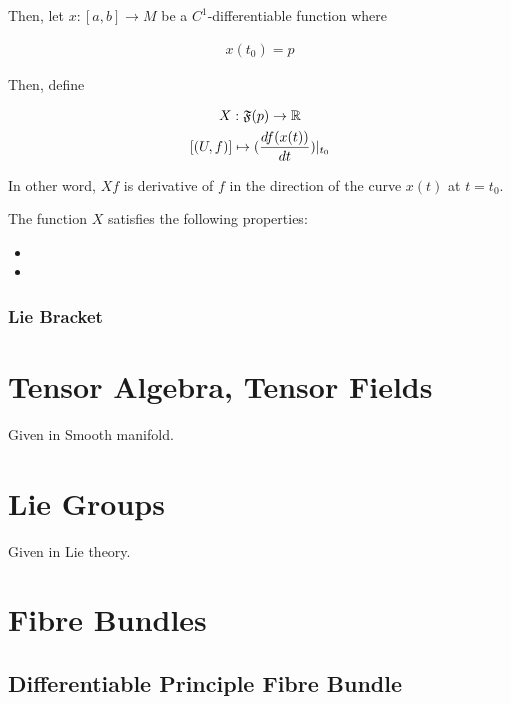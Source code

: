 \documentclass[Total.tex]{subfiles}
\begin{document}
						Then, let $x:[a,b]\rightarrow M$ be a $C^1$-differentiable function where
						
						\begin{gather*}
							x(t_0)=p
						\end{gather*}
						
						Then, define 
						
						\begin{gather*}
							X:\mathfrak{F}(p)\rightarrow \mathbb{R}\\
							[(U,f)]\mapsto (\frac{df(x(t))}{dt})|_{t_0} 
						\end{gather*}
						
						In other word, $Xf$ is derivative of $f$ in the direction of the curve $x(t)$ at $t=t_0$. 
						
						The function $X$ satisfies the following properties:
						
						\begin{itemize}
							\item 
							\item 
						\end{itemize}
						
					\subsubsection{Lie Bracket}
					
		\section{Tensor Algebra, Tensor Fields}
			Given in Smooth manifold.
		\section{Lie Groups}
			Given in Lie theory.
		\section{Fibre Bundles}
			\subsection{Differentiable Principle Fibre Bundle}
			
\end{document}
